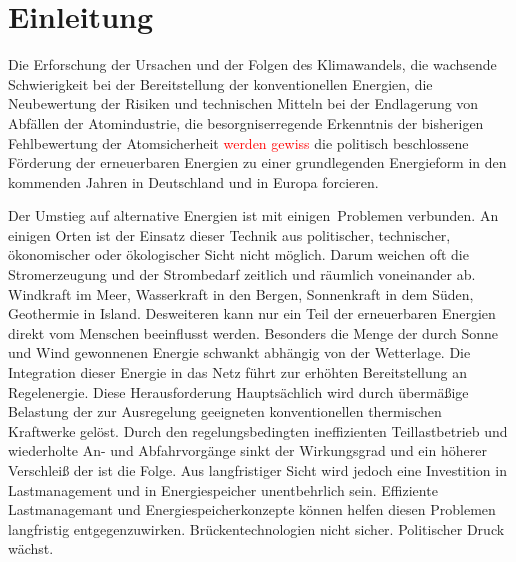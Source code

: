 \chapter{Einleitung}
\label{chap:einleitung}
Die Erforschung der Ursachen und der
Folgen des Klimawandels, die wachsende Schwierigkeit bei der Bereitstellung der
konventionellen Energien, die Neubewertung der Risiken und technischen Mitteln
bei der Endlagerung von Abfällen der Atomindustrie, die besorgniserregende
Erkenntnis der bisherigen Fehlbewertung der Atomsicherheit
\textcolor{red}{werden gewiss} die politisch beschlossene Förderung der
erneuerbaren Energien zu einer grundlegenden Energieform in den kommenden Jahren
in Deutschland und in Europa forcieren.

Der Umstieg auf alternative Energien ist mit einigen$\,$ Problemen verbunden. An einigen Orten ist der Einsatz dieser
Technik aus politischer, technischer, ökonomischer oder ökologischer Sicht nicht
möglich. Darum weichen oft die Stromerzeugung und der Strombedarf zeitlich und
räumlich voneinander ab. Windkraft im Meer, Wasserkraft in den Bergen,
Sonnenkraft in dem Süden, Geothermie in Island. Desweiteren kann nur ein Teil
der erneuerbaren Energien direkt vom Menschen beeinflusst werden. Besonders die
Menge der durch Sonne und Wind gewonnenen Energie schwankt abhängig von der
Wetterlage. Die Integration dieser Energie in das Netz führt zur erhöhten
Bereitstellung an Regelenergie. Diese Herausforderung Hauptsächlich wird durch
übermäßige Belastung der zur Ausregelung geeigneten konventionellen thermischen
Kraftwerke gelöst. Durch den regelungsbedingten ineffizienten Teillastbetrieb
und wiederholte An- und Abfahrvorgänge sinkt der Wirkungsgrad und ein höherer
Verschleiß der ist die Folge. Aus langfristiger Sicht wird
jedoch eine
Investition in Lastmanagement und in Energiespeicher unentbehrlich sein.
Effiziente Lastmanagemant und Energiespeicherkonzepte k\"onnen helfen diesen
Problemen langfristig entgegenzuwirken. Brückentechnologien nicht sicher.
Politischer Druck wächst.

